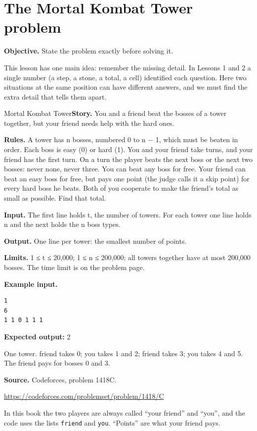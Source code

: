 \documentclass[11pt,a4paper,oneside]{report}
\newcommand{\classref}[1]{\marginpar{\raggedright\fontsize{9}{12}\selectfont\color{quiet}\colorbox{wash}{\heavy\fontsize{8}{10}\selectfont IN THE CLASSROOM}\par\smallskip#1}}
\newcommand{\sectiongoal}[1]{\par{\color{quiet}\textbf{Objective.} #1}\par\smallskip}
\begin{document}
\section{The Mortal Kombat Tower problem}
\classref{L3-01\\L3-02}
\sectiongoal{State the problem exactly before solving it.}
This lesson has one main idea: remember the missing detail. In Lessons 1 and 2 a single number (a step, a stone, a total, a cell) identified each question. Here two situations at the same position can have different answers, and we must find the extra detail that tells them apart.

\begin{problembox}{Mortal Kombat Tower}\textbf{Story.} You and a friend beat the bosses of a tower together, but your friend needs help with the hard ones.\par\smallskip \textbf{Rules.} A tower has n bosses, numbered 0 to n − 1, which must be beaten in order. Each boss is easy (0) or hard (1). You and your friend take turns, and your friend has the first turn. On a turn the player beats the next boss or the next two bosses: never none, never three. You can beat any boss for free. Your friend can beat an easy boss for free, but pays one point (the judge calls it a skip point) for every hard boss he beats. Both of you cooperate to make the friend's total as small as possible. Find that total.\par\smallskip \textbf{Input.} The first line holds t, the number of towers. For each tower one line holds n and the next holds the n boss types.\par\smallskip \textbf{Output.} One line per tower: the smallest number of points.\par\smallskip \textbf{Limits.} 1 ≤ t ≤ 20,000; 1 ≤ n ≤ 200,000; all towers together have at most 200,000 bosses. The time limit is on the problem page.\par\smallskip \textbf{Example input.}
\begin{lstlisting}[language={},aboveskip=2pt,belowskip=2pt]
1
6
1 1 0 1 1 1
\end{lstlisting}
\textbf{Expected output:} 2\par\smallskip One tower. friend takes 0; you takes 1 and 2; friend takes 3; you takes 4 and 5. The friend pays for bosses 0 and 3.\par\smallskip\textbf{Source.} Codeforces, problem 1418C.\par\url{https://codeforces.com/problemset/problem/1418/C}\end{problembox}
In this book the two players are always called “your friend” and “you”, and the code uses the lists \texttt{friend} and \texttt{you}. “Points” are what your friend pays.
\end{document}
